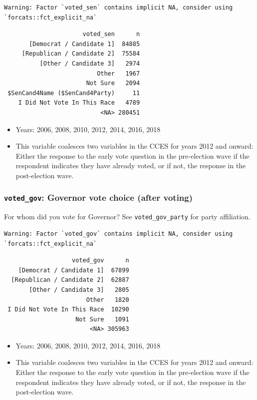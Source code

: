 \documentclass[10pt,article,oneside]{memoir}
\theoremstyle{definition}
\begin{document}
\begin{verbatim}
Warning: Factor `voted_sen` contains implicit NA, consider using
`forcats::fct_explicit_na`
\end{verbatim}

\begin{verbatim}
                      voted_sen      n
       [Democrat / Candidate 1]  84885
     [Republican / Candidate 2]  75584
          [Other / Candidate 3]   2974
                          Other   1967
                       Not Sure   2094
 $SenCand4Name ($SenCand4Party)     11
    I Did Not Vote In This Race   4789
                           <NA> 280451
\end{verbatim}

\begin{itemize}
\tightlist
\item
  Years: 2006, 2008, 2010, 2012, 2014, 2016, 2018
\item
  This variable coalesces two variables in the CCES for years 2012 and
  onward: Either the response to the early vote question in the
  pre-election wave if the respondent indicates they have already voted,
  or if not, the response in the post-election wave.
\end{itemize}

\hypertarget{voted_gov-governor-vote-choice-after-voting}{%
\subsubsection{\texorpdfstring{\texttt{voted\_gov}: Governor vote choice
(after
voting)}{voted\_gov: Governor vote choice (after voting)}}\label{voted_gov-governor-vote-choice-after-voting}}

For whom did you vote for Governor? See \texttt{voted\_gov\_party} for
party affiliation.

\begin{verbatim}
Warning: Factor `voted_gov` contains implicit NA, consider using
`forcats::fct_explicit_na`
\end{verbatim}

\begin{verbatim}
                   voted_gov      n
    [Democrat / Candidate 1]  67899
  [Republican / Candidate 2]  62887
       [Other / Candidate 3]   2805
                       Other   1820
 I Did Not Vote In This Race  10290
                    Not Sure   1091
                        <NA> 305963
\end{verbatim}

\begin{itemize}
\tightlist
\item
  Years: 2006, 2008, 2010, 2012, 2014, 2016, 2018
\item
  This variable coalesces two variables in the CCES for years 2012 and
  onward: Either the response to the early vote question in the
  pre-election wave if the respondent indicates they have already voted,
  or if not, the response in the post-election wave.
\end{itemize}
\end{document}
